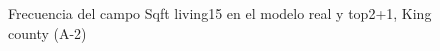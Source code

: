 \begin{figure}[H]
    \centering
    
    \caption{Frecuencia del campo Sqft living15 en el modelo real y top2+1, King county (A-2)}
    \label{frecuency-top2+1-sqft living15}
\end{figure}